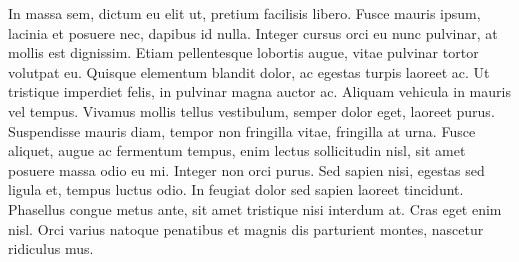 \documentclass{news}
\begin{document}
\begin{multicols}{4}
In massa sem, dictum eu elit ut, pretium facilisis libero. Fusce mauris ipsum, lacinia et posuere nec, dapibus id nulla. Integer cursus orci eu nunc pulvinar, at mollis est dignissim. Etiam pellentesque lobortis augue, vitae pulvinar tortor volutpat eu. Quisque elementum blandit dolor, ac egestas turpis laoreet ac. Ut tristique imperdiet felis, in pulvinar magna auctor ac. Aliquam vehicula in mauris vel tempus. Vivamus mollis tellus vestibulum, semper dolor eget, laoreet purus. Suspendisse mauris diam, tempor non fringilla vitae, fringilla at urna. Fusce aliquet, augue ac fermentum tempus, enim lectus sollicitudin nisl, sit amet posuere massa odio eu mi. Integer non orci purus. Sed sapien nisi, egestas sed ligula et, tempus luctus odio. In feugiat dolor sed sapien laoreet tincidunt. Phasellus congue metus ante, sit amet tristique nisi interdum at. Cras eget enim nisl. Orci varius natoque penatibus et magnis dis parturient montes, nascetur ridiculus mus.

\end{multicols}
\end{document}
